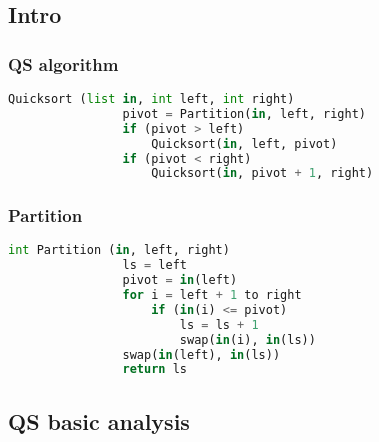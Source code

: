 \subsection{Intro}
    \subsubsection{QS algorithm}
    \begin{definition}
        \begin{lstlisting}[language=Python, caption={Quicksort Algorithm Pseudocode}]
            Quicksort (list in, int left, int right)
                pivot = Partition(in, left, right)
                if (pivot > left)
                    Quicksort(in, left, pivot)
                if (pivot < right)
                    Quicksort(in, pivot + 1, right)
        \end{lstlisting}
    \end{definition}

    \subsubsection{Partition}
    \begin{definition}
        \begin{lstlisting}[language=Python, caption={Partition Function Pseudocode}]
            int Partition (in, left, right)
                ls = left
                pivot = in(left)
                for i = left + 1 to right
                    if (in(i) <= pivot)
                        ls = ls + 1
                        swap(in(i), in(ls))
                swap(in(left), in(ls))
                return ls
        \end{lstlisting}
    \end{definition}

    \begin{intuition}
    \end{intuition}

\subsection{QS basic analysis}
